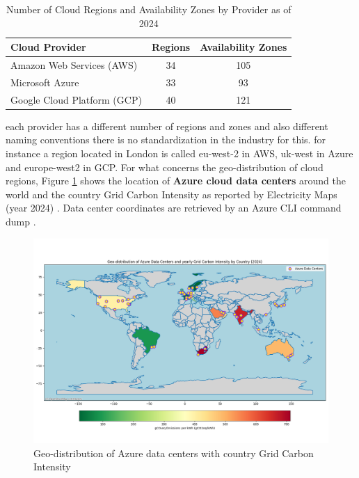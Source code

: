 \begin{table}[h]
    \centering
    \begin{tabular}{|l|c|c|}
    \hline
    \textbf{Cloud Provider} & \textbf{Regions} & \textbf{Availability Zones} \\
    \hline
    Amazon Web Services (AWS) & 34 & 105 \\
    \hline
    Microsoft Azure & 33 & 93 \\
    \hline
    Google Cloud Platform (GCP) & 40 & 121 \\
    \hline
    \end{tabular}
    \caption{Number of Cloud Regions and Availability Zones by Provider as of 2024 \cite{stat}}
    \label{tab:cloud_regions_azs}
\end{table}

    
each provider has a different number of regions and zones and also different naming conventions
there is no standardization in the industry for this. 
for instance a region located in London is called eu-west-2 in AWS, uk-west in Azure and europe-west2 in GCP.
For what concerns the geo-distribution of cloud regions, Figure \ref{fig:azure_data_centers} shows the location of \textbf{Azure cloud data centers} around the world and the country Grid Carbon Intensity as reported by Electricity Maps (year 2024) \cite{electricity_maps}.
Data center coordinates are retrieved by an Azure CLI command dump \cite{azure_data_centers_information}.

\begin{figure}[H]
    \centering
    \includegraphics[width=1\linewidth]{images/azure_data_centers.png}
    \caption{Geo-distribution of Azure data centers with country Grid Carbon Intensity}
    \label{fig:azure_data_centers}
\end{figure}

